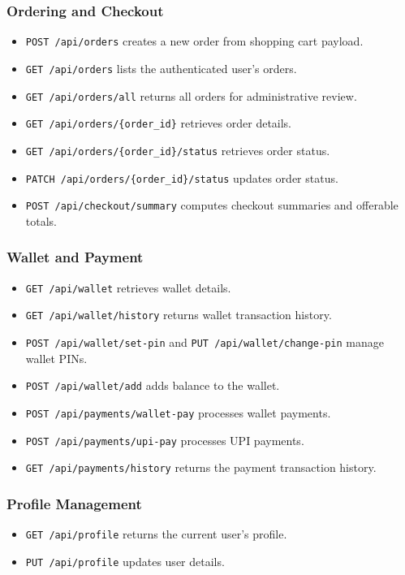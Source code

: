 \documentclass[11pt]{article}
\begin{document}
\subsubsection{Ordering and Checkout}
\begin{itemize}[nosep]
  \item \texttt{POST /api/orders} creates a new order from shopping cart payload.
  \item \texttt{GET /api/orders} lists the authenticated user's orders.
  \item \texttt{GET /api/orders/all} returns all orders for administrative review.
  \item \texttt{GET /api/orders/\{order\_id\}} retrieves order details.
  \item \texttt{GET /api/orders/\{order\_id\}/status} retrieves order status.
  \item \texttt{PATCH /api/orders/\{order\_id\}/status} updates order status.
  \item \texttt{POST /api/checkout/summary} computes checkout summaries and offerable totals.
\end{itemize}

\subsubsection{Wallet and Payment}
\begin{itemize}[nosep]
  \item \texttt{GET /api/wallet} retrieves wallet details.
  \item \texttt{GET /api/wallet/history} returns wallet transaction history.
  \item \texttt{POST /api/wallet/set-pin} and \texttt{PUT /api/wallet/change-pin} manage wallet PINs.
  \item \texttt{POST /api/wallet/add} adds balance to the wallet.
  \item \texttt{POST /api/payments/wallet-pay} processes wallet payments.
  \item \texttt{POST /api/payments/upi-pay} processes UPI payments.
  \item \texttt{GET /api/payments/history} returns the payment transaction history.
\end{itemize}

\subsubsection{Profile Management}
\begin{itemize}[nosep]
  \item \texttt{GET /api/profile} returns the current user's profile.
  \item \texttt{PUT /api/profile} updates user details.
\end{itemize}
\end{document}
